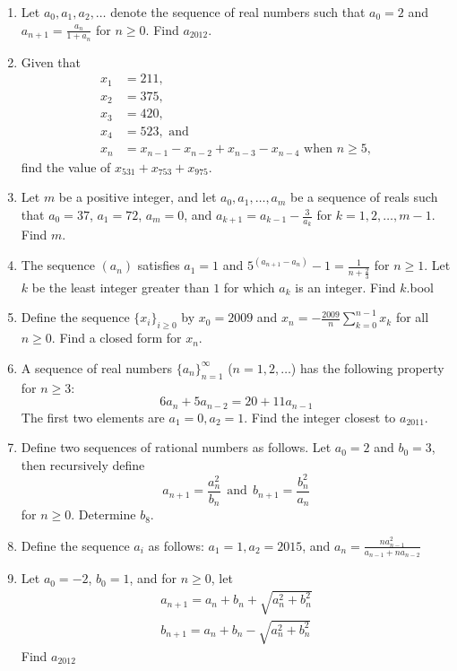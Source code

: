 \documentclass[11pt]{article}
\theoremstyle{theorem}
\theoremstyle{definition}
\theoremstyle{remark}
\theoremstyle{definition}
\theoremstyle{remark}
\begin{document}
\begin{enumerate}
\item Let $a_0, a_1, a_2, \ldots$ denote the sequence of real numbers such that $a_0 = 2$ and $a_{n+1}=\frac{a_n}{1+a_n}$ for $n \ge 0$. Find $a_{2012}$. %
\item Given that
\begin{align*}
x_{1}&=211,\\ 
x_{2}&=375,\\ 
x_{3}&=420,\\ 
x_{4}&=523, \text{ and}\\ 
x_{n}&=x_{n-1}-x_{n-2}+x_{n-3}-x_{n-4} \text{ when } n \geq 5, 
\end{align*}
find the value of $x_{531}+x_{753}+x_{975}$.
\item Let $m$ be a positive integer, and let $a_0, a_1,\ldots,a_m$ be a sequence of reals such that $a_0=37$, $a_1=72$, $a_m=0$, and $a_{k+1}=a_{k-1}-\frac{3}{a_k}$ for $k=1,2, \dots, m-1$. Find $m$. %
\item The sequence $ (a_n)$ satisfies $ a_1 = 1$ and $ \displaystyle 5^{(a_{n+1}-a_n)} - 1 = \frac{1}{n+\frac{2}{3}}$ for $ n \geq 1$. Let $ k$ be the least integer greater than $ 1$ for which $ a_k$ is an integer. Find $ k$.bool 
\item Define the sequence $\{x_i\}_{i \ge 0}$ by $x_{0}=2009$ and $x_n = -\frac{2009}{n}\sum_{k = 0}^{n-1} x_{k}$ for all $n \ge 0$. Find a closed form for $x_n$. %
\item A sequence of real numbers $\{a_n\}_{n=1}^{\infty}$ ($n = 1,2,\ldots$) has the following property for $n \ge 3$:
\[6a_n + 5a_{n-2} = 20 + 11a_{n-1}\] 
The first two elements are $a_1=0, a_2 = 1$. Find the integer closest to $a_{2011}$.%
\item Define two sequences of rational numbers as follows. Let $a_0=2$ and $b_0=3$, then recursively define
\[a_{n+1} = \frac{a_n^2}{b_n} \ \  \text{and} \ \ b_{n+1} = \frac{b_n^2}{a_n} \] for $n \ge 0$. Determine $b_8$. %
\item Define the sequence $a_i$ as follows: $a_1=1, a_2 = 2015$, and $a_n=\frac{na_{n-1}^2}{a_{n-1}+na_{n-2}}$ %
\item Let $a_0=-2$, $b_0=1$, and for $n\ge 0$, let
\begin{align*}
a_{n+1}=a_n+b_n+\sqrt{a_n^2+b_n^2}\\
b_{n+1}=a_n+b_n-\sqrt{a_n^2+b_n^2}
\end{align*}
Find $a_{2012}$ %

\end{enumerate}
\end{document}
